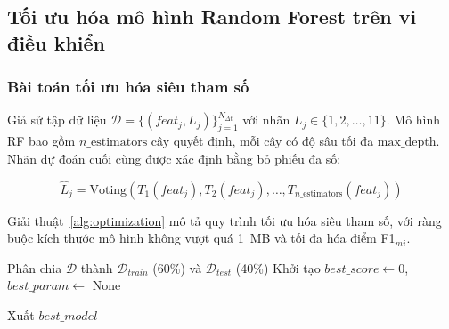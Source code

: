 \subsection{Tối ưu hóa mô hình Random Forest trên vi điều khiển}

\subsubsection{Bài toán tối ưu hóa siêu tham số}

Giả sử tập dữ liệu $\mathcal{D} = \{(feat_j, L_j)\}_{j=1}^{N_{\Delta t}}$ với nhãn $L_j \in \{1, 2, \ldots, 11\}$. Mô hình RF bao gồm $n\_\text{estimators}$ cây quyết định, mỗi cây có độ sâu tối đa $\text{max\_depth}$. Nhãn dự đoán cuối cùng được xác định bằng bỏ phiếu đa số:

\begin{equation}
\hat{L}_j = \text{Voting}(T_1(feat_j), T_2(feat_j), \ldots, T_{n\_\text{estimators}}(feat_j))
\end{equation}

Giải thuật~\ref{alg:optimization} mô tả quy trình tối ưu hóa siêu tham số, với ràng buộc kích thước mô hình không vượt quá 1~MB và tối đa hóa điểm F1$_{mi}$.

\begin{algorithm}[!htb]
\footnotesize
\caption{\footnotesize Tối ưu hóa siêu tham số cho mô hình ML}
\label{alg:optimization}

Phân chia $\mathcal{D}$ thành $\mathcal{D}_{train}$ (60\%) và $\mathcal{D}_{test}$ (40\%)\;
Khởi tạo $best\_score \leftarrow 0$, $best\_param \leftarrow$ None\;

Xuất $best\_model$\;
\end{algorithm}

